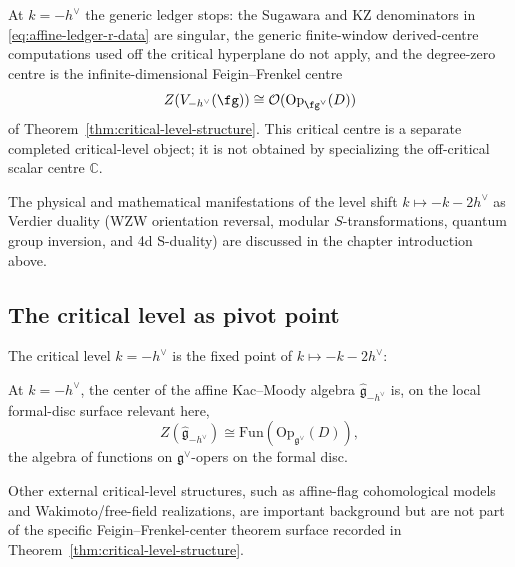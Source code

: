 \begin{proposition}
At \(k=-h^\vee\) the generic ledger stops: the Sugawara and KZ
denominators in \eqref{eq:affine-ledger-r-data} are singular, the
generic finite-window derived-centre computations used off the
critical hyperplane do not apply, and the
degree-zero centre is the infinite-dimensional Feigin--Frenkel centre
\[
Z(V_{-h^\vee}(\fg))
\cong \mathcal O(\mathrm{Op}_{\fg^\vee}(D))
\]
of Theorem~\ref{thm:critical-level-structure}.  This critical centre
is a separate completed critical-level object; it is not obtained by
specializing the off-critical scalar centre \(\mathbb C\).
\end{proposition}

\begin{remark}
The physical and mathematical manifestations of the level shift
$k \mapsto -k - 2h^\vee$ as Verdier duality (WZW orientation
reversal, modular $S$-transformations, quantum group inversion,
and 4d S-duality) are discussed in the chapter introduction above.
\end{remark}

\subsection{The critical level as pivot point}

The critical level $k = -h^\vee$ is the fixed point of $k \mapsto -k-2h^\vee$:

\begin{theorem}\label{thm:critical-level-structure}
At $k = -h^\vee$, the center of the affine Kac--Moody algebra
$\widehat{\mathfrak{g}}_{-h^\vee}$ is, on the local formal-disc surface
relevant here,
\begin{equation}
Z(\widehat{\mathfrak{g}}_{-h^\vee}) \cong
\mathrm{Fun}(\mathrm{Op}_{\mathfrak{g}^\vee}(D)),
\end{equation}
the algebra of functions on $\mathfrak{g}^\vee$-opers on the formal
disc.
\end{theorem}

\begin{remark}
Other external critical-level structures, such as affine-flag
cohomological models and Wakimoto/free-field realizations, are
important background but are not part of the specific
Feigin--Frenkel-center theorem surface recorded in
Theorem~\ref{thm:critical-level-structure}.
\end{remark}

